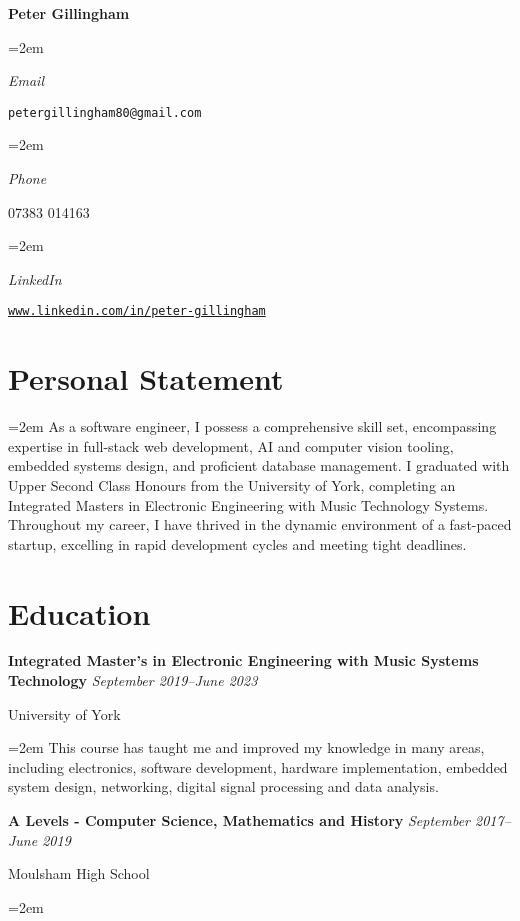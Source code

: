 \documentclass[12pt]{article} %
\newlength{\spacebox}
\newcommand{\sepspace}{\vspace*{1em}}
\newcommand{\name}[1]{
\Huge %
\fontfamily{phv}\selectfont %
\begin{center} \textbf{#1} \end{center}\par
\normalsize\normalfont}
\newcommand{\info}[2]{
    \noindent\hangindent=2em\hangafter=0
    \parbox{\spacebox}{%
    \textsl{#1}} %
    #2 \par} %
\newcommand{\education}[4]{
\noindent  \textbf{#1}
  \newline
  \noindent \textit{#2} \par
  \noindent #3 \par
\vspace*{0.5em}
  \noindent\hangindent=2em\hangafter=0 \small #4
\normalsize \par}
\newcommand{\personalstatement}[1]{
  \vspace*{0.5em}
  \noindent\hangindent=2em\hangafter=0 \small #1 
\normalsize \par}
\begin{document}
\name{Peter Gillingham}
\vspace*{-10pt}

\sepspace
\info{Email}{\texttt{petergillingham80@gmail.com}}
\info{Phone}{07383 014163}
\info{LinkedIn}{\texttt{\url{www.linkedin.com/in/peter-gillingham}}}

\section*{Personal Statement}
\personalstatement{As a software engineer, I possess a comprehensive skill set, encompassing expertise in full-stack web development, AI and computer vision tooling, embedded systems design, and proficient database management. I graduated with Upper Second Class Honours from the University of York, completing an Integrated Masters in Electronic Engineering with Music Technology Systems. Throughout my career, I have thrived in the dynamic environment of a fast-paced startup, excelling in rapid development cycles and meeting tight deadlines.}

\section*{Education}

\education{Integrated Master's in Electronic Engineering with Music Systems Technology}{September 2019--June 2023}{University of York}{This course has taught me and improved my knowledge in many areas, including electronics, software development, hardware implementation, embedded system design, networking, digital signal processing and data analysis. \\}

\education{A Levels - Computer Science, Mathematics and History}{September 2017--June 2019}{Moulsham High School}{}
\end{document}

